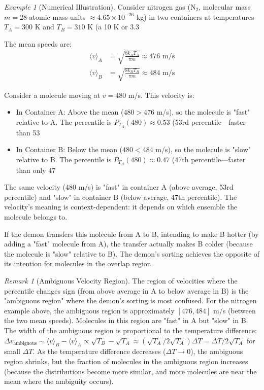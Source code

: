 \documentclass[12pt,a4paper]{article}
\theoremstyle{definition}
\theoremstyle{remark}
\newtheorem{remark}[theorem]{Remark}
\newtheorem{example}[theorem]{Example}
\begin{document}
\begin{example}[Numerical Illustration]
\label{ex:nitrogen_percentiles}
Consider nitrogen gas (N$_2$, molecular mass $m = 28$ atomic mass units $\approx 4.65 \times 10^{-26}$ kg) in two containers at temperatures $T_A = 300$ K and $T_B = 310$ K (a 10 K or 3.3%

The mean speeds are:
\begin{align}
\langle v \rangle_A &= \sqrt{\frac{8k_B T_A}{\pi m}} \approx 476 \text{ m/s} \\
\langle v \rangle_B &= \sqrt{\frac{8k_B T_B}{\pi m}} \approx 484 \text{ m/s}
\end{align}

Consider a molecule moving at $v = 480$ m/s. This velocity is:
\begin{itemize}
    \item In Container A: Above the mean ($480 > 476$ m/s), so the molecule is "fast" relative to A. The percentile is $P_{T_A}(480) \approx 0.53$ (53rd percentile—faster than 53%
    \item In Container B: Below the mean ($480 < 484$ m/s), so the molecule is "slow" relative to B. The percentile is $P_{T_B}(480) \approx 0.47$ (47th percentile—faster than only 47%
\end{itemize}

The same velocity (480 m/s) is "fast" in container A (above average, 53rd percentile) and "slow" in container B (below average, 47th percentile). The velocity's meaning is context-dependent: it depends on which ensemble the molecule belongs to.

If the demon transfers this molecule from A to B, intending to make B hotter (by adding a "fast" molecule from A), the transfer actually makes B colder (because the molecule is "slow" relative to B). The demon's sorting achieves the opposite of its intention for molecules in the overlap region.
\end{example}

\begin{remark}[Ambiguous Velocity Region]
\label{rem:ambiguous_region}
The region of velocities where the percentile changes sign (from above average in A to below average in B) is the "ambiguous region" where the demon's sorting is most confused. For the nitrogen example above, the ambiguous region is approximately $[476, 484]$ m/s (between the two mean speeds). Molecules in this region are "fast" in A but "slow" in B. The width of the ambiguous region is proportional to the temperature difference: $\Delta v_{\text{ambiguous}} \sim \langle v \rangle_B - \langle v \rangle_A \propto \sqrt{T_B} - \sqrt{T_A} \approx (\sqrt{T_A} / 2\sqrt{T_A}) \Delta T = \Delta T / 2\sqrt{T_A}$ for small $\Delta T$. As the temperature difference decreases ($\Delta T \to 0$), the ambiguous region shrinks, but the fraction of molecules in the ambiguous region increases (because the distributions become more similar, and more molecules are near the mean where the ambiguity occurs).
\end{remark}
\end{document}
